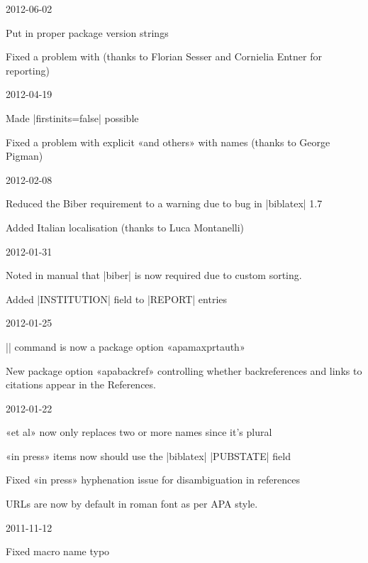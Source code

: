 \documentclass{ltxdockit}
\begin{document}
\begin{changelog}
\begin{release}{4.8}{2012-06-02}
\item Put in proper package version strings
\item Fixed a problem with  (thanks to Florian Sesser and
  Cornielia Entner for reporting)
\end{release}

\begin{release}{4.7}{2012-04-19}
\item Made |firstinits=false| possible
\item Fixed a problem with explicit «and others» with names (thanks to
  George Pigman)
\end{release}

\begin{release}{4.6}{2012-02-08}
\item Reduced the Biber requirement to a warning due to bug in |biblatex| 1.7
\item Added Italian localisation (thanks to Luca Montanelli)
\end{release}

\begin{release}{4.5}{2012-01-31}
\item Noted in manual that |biber| is now required due to custom sorting.
\item Added |INSTITUTION| field to |REPORT| entries
\end{release}

\begin{release}{4.4}{2012-01-25}
\item |\maxprtauth| command is now a package option «apamaxprtauth»
\item New package option «apabackref» controlling whether
  backreferences and links to citations appear in the References.
\end{release}

\begin{release}{4.3}{2012-01-22}
\item «et al» now only replaces two or more names since it's plural
\item «in press» items now should use the |biblatex| |PUBSTATE| field
\item Fixed «in press» hyphenation issue for disambiguation in references
\item URLs are now by default in roman font as per APA style.
\end{release}

\begin{release}{4.2}{2011-11-12}
\item Fixed macro name typo
\end{release}


\end{changelog}
\end{document}
